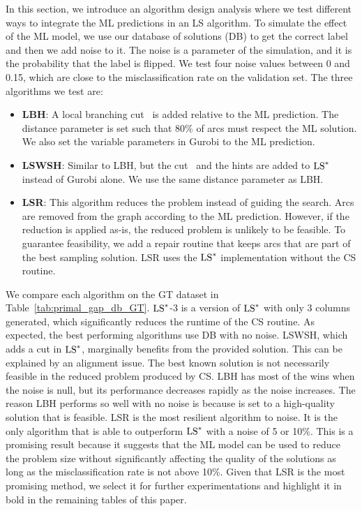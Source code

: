 \documentclass[3p, authoryear, times, doubleblind]{elsarticle}
\begin{document}
{In this section, we introduce an algorithm design analysis where we test different ways to integrate the ML predictions in an LS algorithm. To simulate the effect of the ML model, we use our database of solutions (DB) to get the correct label and then we add noise to it. The noise is a parameter of the simulation, and it is the probability that the label is flipped. We test four noise values between 0 and 0.15, which are close to the misclassification rate on the validation set. The three algorithms we test are: 
\begin{itemize}
    \item \textbf{LBH}: A local branching cut~ is added relative to the ML prediction. The distance parameter is set such that 80\% of arcs must respect the ML solution. We also set the variable parameters  in Gurobi to the ML prediction.
    \item \textbf{LSWSH}: Similar to LBH, but the cut~ and the hints are added to $\text{LS}^*$ instead of Gurobi alone. We use the same distance parameter as LBH. 
    \item \textbf{LSR}: This algorithm reduces the problem instead of guiding the search. Arcs are removed from the graph according to the ML prediction. However, if the reduction is applied as-is, the reduced problem is unlikely to be feasible. To guarantee feasibility, we add a repair routine that keeps arcs that are part of the best sampling solution. LSR uses the $\text{LS}^*$ implementation without the CS routine. 
\end{itemize}
We compare each algorithm on the GT dataset in Table~\ref{tab:primal_gap_db_GT}. $\text{LS}^*$-3 is a version of $\text{LS}^*$ with only 3 columns generated, which significantly reduces the runtime of the CS routine. As expected, the best performing algorithms use DB with no noise. LSWSH, which adds a cut in $\text{LS}^*$, marginally benefits from the provided solution. This can be explained by an alignment issue. The best known solution is not necessarily feasible in the reduced problem produced by CS. LBH has most of the wins when the noise is null, but its performance decreases rapidly as the noise increases. The reason LBH performs so well with no noise is because  is set to a high-quality solution that is feasible. LSR is the most resilient algorithm to noise. It is the only algorithm that is able to outperform $\text{LS}^*$ with a noise of 5 or 10\%. This is a promising result because it suggests that the ML model can be used to reduce the problem size without significantly affecting the quality of the solutions as long as the misclassification rate is not above 10\%. \startblue Given that LSR is the most promising method, we select it for further experimentations and highlight it in bold in the remaining tables of this paper. \stopblue 


}
\end{document}
